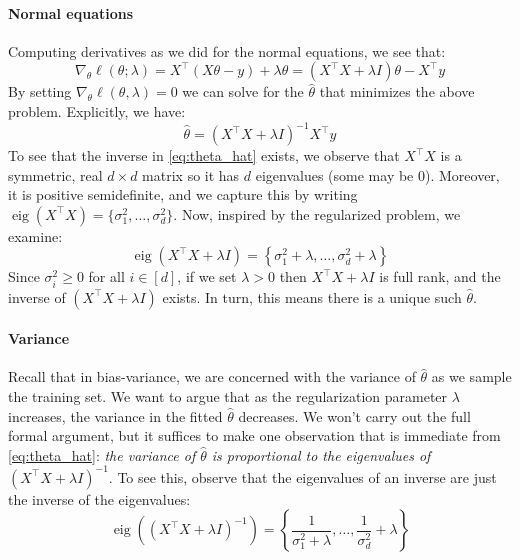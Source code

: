 \paragraph{Normal equations} Computing derivatives as we did for the normal
equations, we see that:
\begin{equation}
    \nabla_\theta \ell(\theta; \lambda) = X^\top(X\theta - y) + \lambda\theta = (X^\top X + \lambda I)\theta - X^\top y
\end{equation}
By setting $\nabla_\theta \ell(\theta,\lambda) = 0$ we can solve for the $\hat{\theta}$
that minimizes the above problem. Explicitly, we have:
\begin{equation}\label{eq:theta_hat}
    \hat{\theta} = ( X^\top X + \lambda I)^{-1} X^\top y
\end{equation}
To see that the inverse in \cref{eq:theta_hat} exists, we observe that $X^\top X$ is a symmetric,
real $d \times d$ matrix so it has $d$ eigenvalues (some may be $0$). Moreover, it is positive
semidefinite, and we capture this by writing $\operatorname{eig}(X^\top X) = \{\sigma^2_1 ,\ldots, \sigma^2_d\}$.
Now, inspired by the regularized problem, we examine:
\begin{equation}
    \operatorname{eig}(X^\top X + \lambda I) = \left\{ \sigma^2_1 + \lambda,\ldots,\sigma^2_d + \lambda\right\}
\end{equation}
Since $\sigma^2_i \ge 0$ for all $i \in [d]$, if we set $\lambda > 0$ then $X^\top X +\lambda I$ is full rank, and the
inverse of $(X^\top X + \lambda I)$ exists. In turn, this means there is a unique such $\hat{\theta}$.

\paragraph{Variance} Recall that in bias-variance, we are concerned with the variance of
$\hat{\theta}$ as we sample the training set. We want to argue that as the regularization
parameter $\lambda$ increases, the variance in the fitted $\hat{\theta}$ decreases. We won't carry
out the full formal argument, but it suffices to make one observation that is
immediate from \cref{eq:theta_hat}: \textit{the variance of $\hat{\theta}$ is proportional to the eigenvalues of
$(X^\top X + \lambda I)^{-1}$}. To see this, observe that the eigenvalues of an inverse are just
the inverse of the eigenvalues:
\begin{equation}
    \operatorname{eig}\left( (X^\top X + \lambda I)^{-1} \right) = \left\{ \frac{1}{\sigma^2_1 + \lambda}, \ldots, \frac{1}{\sigma^2_d} + \lambda \right\}
\end{equation}

